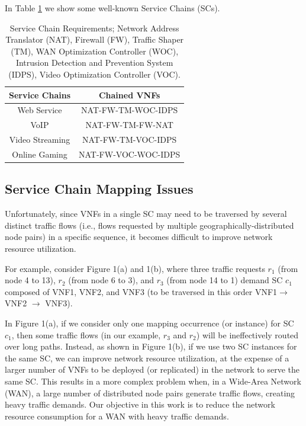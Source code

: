 \documentclass[12pt]{article}
\begin{document}
In Table \ref{table:1} we show some well-known Service Chains (SCs). \\
\begin{table}[t!]
\centering
\begin{tabular}{|c c|} 
 \hline
 Service Chains & Chained VNFs \\ [0.5ex] 
 \hline 
 Web Service & NAT-FW-TM-WOC-IDPS\\ 
VoIP &NAT-FW-TM-FW-NAT \\
 Video Streaming & NAT-FW-TM-VOC-IDPS \\
 Online Gaming&NAT-FW-VOC-WOC-IDPS\\[1ex] 
 \hline
\end{tabular}
\caption{Service Chain Requirements; Network Address Translator (NAT), Firewall (FW), Traffic Shaper (TM), WAN Optimization Controller (WOC), Intrusion Detection and Prevention System (IDPS), Video Optimization Controller (VOC).}
\label{table:1}
\end{table}

\subsection{Service Chain Mapping Issues}
Unfortunately, since VNFs in a single SC may need to be traversed by several distinct traffic flows (i.e., flows requested by multiple geographically-distributed node pairs) in a specific sequence, it becomes difficult to improve network resource utilization.

For example, consider Figure 1(a) and 1(b), where three traffic requests $r_1$ (from node 4 to 13), $r_2$ (from node 6 to 3), and $r_3$ (from node 14 to 1) demand SC $c_1$ composed of VNF1, VNF2, and VNF3 (to be traversed in this order VNF1$\rightarrow$ VNF2  $\rightarrow$ VNF3).

In Figure 1(a), if we consider only one mapping occurrence (or instance) for SC $c_1$, then some traffic flows (in our example, $r_3$ and $r_2$) will be ineffectively routed over long paths. Instead, as shown in Figure 1(b), if we use two SC instances for the same SC, we can improve network resource utilization, at the expense of a larger number of VNFs to be deployed (or replicated) in the network to serve the same SC. This results in a more complex problem when, in a Wide-Area Network (WAN), a large number of distributed node pairs generate traffic flows, creating heavy traffic demands. Our objective in this work is to reduce the network resource consumption for a WAN with heavy traffic demands.
\end{document}

